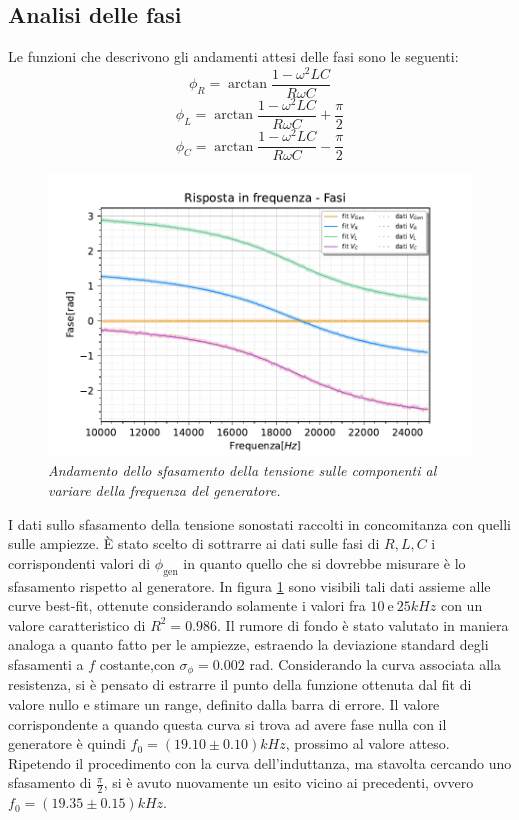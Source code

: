 \subsection{Analisi delle fasi}

Le funzioni che descrivono gli andamenti attesi delle fasi sono le seguenti:
 \[
     \phi_R = \arctan{\frac{1 - \omega^2 L C}{R \omega C}}
 \]
\[
    \phi_L = \arctan{\frac{1 - \omega^2 L C}{R \omega C}} + \frac{\pi}{2}
\]
 \[
     \phi_C = \arctan{\frac{1 - \omega^2 L C}{R \omega C}} - \frac{\pi}{2}
 \]

\begin{figure}[h]
    \centering
    \includegraphics[width=.9\textwidth]{../figs/Risposta-in-frequenza-fasi.pdf}
    \caption{\emph{Andamento dello sfasamento della tensione sulle componenti al variare della frequenza del generatore.}}
    \label{fig:fasi}
\end{figure}

I dati sullo sfasamento della tensione sonostati raccolti in concomitanza con quelli sulle ampiezze. È stato scelto di
sottrarre ai dati sulle fasi di $R, L , C$ i corrispondenti valori di $\phi_{\text{gen}}$ in quanto quello che
si dovrebbe misurare è lo sfasamento rispetto al generatore.
In figura \ref{fig:fasi} sono visibili tali dati assieme alle curve best-fit, ottenute considerando solamente i valori
fra $10  \ \text{e} \ 25 kHz$ con un valore caratteristico di $R^2 = 0.986$. Il rumore di fondo è stato valutato in
maniera analoga a quanto fatto per le ampiezze, estraendo la deviazione standard degli sfasamenti a $f$ costante,con
$\sigma_{\phi} = 0.002$ rad.
Considerando la curva associata alla resistenza, si è pensato di estrarre il punto della funzione ottenuta dal
fit di valore nullo e stimare un range, definito dalla barra di errore. Il valore corrispondente a quando questa curva si trova ad avere fase nulla con il generatore
è quindi $f_0 = (19.10 \pm 0.10)kHz$, prossimo al valore atteso. Ripetendo il procedimento con la curva dell’induttanza,
ma stavolta cercando uno sfasamento di $\frac{\pi}{2}$, si è avuto nuovamente un esito vicino ai precedenti, ovvero
$f_0 = (19.35 \pm 0.15)kHz$.

